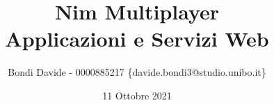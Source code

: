 \title{
    Nim Multiplayer \\
    \large Applicazioni e Servizi Web
}

\author{Bondi Davide - 0000885217 \{davide.bondi3@studio.unibo.it\}}

\date{11 Ottobre 2021}
